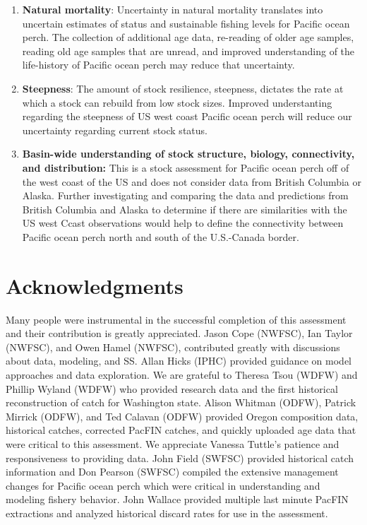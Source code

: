 \documentclass[12pt,]{article}
\begin{document}
\begin{enumerate}

\item \textbf{Natural mortality}: Uncertainty in natural mortality translates into uncertain estimates of status and sustainable fishing levels for Pacific ocean perch. The collection of additional age data, re-reading of older age samples, reading old age samples that are unread, and improved understanding of the life-history of Pacific ocean perch may reduce that uncertainty.

\item \textbf{Steepness}: The amount of stock resilience, steepness, dictates the rate at which a stock can rebuild from low stock sizes.  Improved understanting regarding the steepness of US west coast Pacific ocean perch will reduce our uncertainty regarding current stock status.

\item \textbf{Basin-wide understanding of stock structure, biology, connectivity, and distribution:} This is a stock assessment for Pacific ocean perch off of the west coast of the US and does not consider data from British Columbia or Alaska. Further investigating and comparing the data and predictions from British Columbia and Alaska to determine if there are similarities with the US west Ccast observations would help to define the connectivity between Pacific ocean perch north and south of the U.S.-Canada border.


\end{enumerate}

\section{Acknowledgments}\label{acknowledgments}

Many people were instrumental in the successful completion of this
assessment and their contribution is greatly appreciated. Jason Cope
(NWFSC), Ian Taylor (NWFSC), and Owen Hamel (NWFSC), contributed greatly
with discussions about data, modeling, and SS. Allan Hicks (IPHC)
provided guidance on model approaches and data exploration. We are
grateful to Theresa Tsou (WDFW) and Phillip Wyland (WDFW) who provided
research data and the first historical reconstruction of catch for
Washington state. Alison Whitman (ODFW), Patrick Mirrick (ODFW), and Ted
Calavan (ODFW) provided Oregon composition data, historical catches,
corrected PacFIN catches, and quickly uploaded age data that were
critical to this assessment. We appreciate Vanessa Tuttle's patience and
responsiveness to providing data. John Field (SWFSC) provided historical
catch information and Don Pearson (SWFSC) compiled the extensive
management changes for Pacific ocean perch which were critical in
understanding and modeling fishery behavior. John Wallace provided
multiple last minute PacFIN extractions and analyzed historical discard
rates for use in the assessment.
\end{document}
